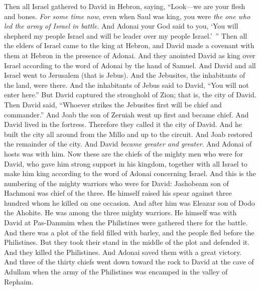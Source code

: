 \begin{biblechapter} %
 Then all Israel gathered to David in Hebron, saying, “Look—we are your flesh and bones.
\verse \textit{For some time now}, even when Saul was king, you were \textit{the one who led the army of Israel in battle}. And Adonai your God said to you, ‘You will shepherd my people Israel and will be leader over my people Israel.’ ”
\verse Then all the elders of Israel came to the king at Hebron, and David made a covenant with them at Hebron in the presence of Adonai. And they anointed David as king over Israel according to the word of Adonai by the hand of Samuel.
\verse And David and all Israel went to Jerusalem (that is Jebus). And the Jebusites, the inhabitants of the land, were there.
\verse And the inhabitants of Jebus said to David, “You will not enter here.” But David captured the stronghold of Zion; that is, the city of David.
\verse Then David said, “Whoever strikes the Jebusites first will be chief and commander.” And Joab the son of Zeruiah went up first and became chief.
\verse And David lived in the fortress. Therefore they called it the city of David.
\verse And he built the city all around from the Millo and up to the circuit. And Joab restored the remainder of the city.
\verse And David \textit{became greater and greater}. And Adonai of hosts was with him.
 Now these are the chiefs of the mighty men who were for David, who gave him strong support in his kingdom, together with all Israel to make him king according to the word of Adonai concerning Israel.
\verse And this is the numbering of the mighty warriors who were for David: Jashobeam son of Hachmoni was chief of the three. He himself raised his spear against three hundred whom he killed on one occasion.
\verse And after him was Eleazar son of Dodo the Ahohite. He was among the three mighty warriors.
\verse He himself was with David at Pas-Dammim when the Philistines were gathered there for the battle. And there was a plot of the field filled with barley, and the people fled before the Philistines.
\verse But they took their stand in the middle of the plot and defended it. And they killed the Philistines. And Adonai saved them with a great victory.
\verse And three of the thirty chiefs went down toward the rock to David at the cave of Adullam when the army of the Philistines was encamped in the valley of Rephaim.

\end{biblechapter}
